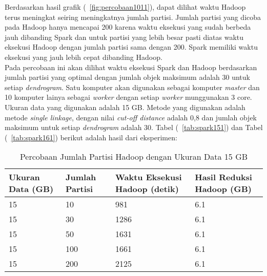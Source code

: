 Berdasarkan hasil grafik (~\ref{fig:percobaan1011}), dapat dilihat waktu Hadoop terus meningkat seiring meningkatnya jumlah partisi. Jumlah partisi yang dicoba pada Hadoop hanya mencapai 200 karena waktu eksekusi yang sudah berbeda jauh dibanding Spark dan untuk partisi yang lebih besar pasti diatas waktu eksekusi Hadoop dengan jumlah partisi sama dengan 200. Spark memiliki waktu eksekusi yang jauh lebih cepat dibanding Hadoop.  \\





Pada percobaan ini akan dilihat waktu eksekusi Spark dan Hadoop berdasarkan jumlah partisi yang optimal dengan jumlah objek maksimum adalah 30 untuk setiap \textit{dendrogram}. Satu komputer akan digunakan sebagai komputer \textit{master} dan 10 komputer lainya sebagai \textit{worker} dengan setiap \textit{worker} munggunakan 3 core. Ukuran data yang digunakan adalah 15 GB. Metode yang digunakan adalah metode \textit{single linkage}, dengan nilai \textit{cut-off distance} adalah 0,8 dan jumlah objek maksimum untuk setiap \textit{dendrogram} adalah 30. Tabel (~\ref{tab:spark151}) dan Tabel (~\ref{tab:spark161}) berikut adalah hasil dari eksperimen:





\begin{table}[H] 
	\centering 
	\caption{Percobaan Jumlah Partisi Hadoop dengan Ukuran Data 15 GB}
	\label{tab:spark1511}
	\begin{tabular}{|p{3cm}|p{3cm}|p{4cm}|p{4cm}|}
\hline
Ukuran Data (GB) & Jumlah Partisi &  Waktu Eksekusi Hadoop (detik) & Hasil Reduksi Hadoop (GB)\\
\hline
15 & 10 & 981  & 6.1  \\
\hline
15 & 30 & 1286  & 6.1  \\
\hline
15 & 50 & 1631  & 6.1  \\
\hline
15 & 100 & 1661 & 6.1  \\
\hline
15 & 200 & 2125 & 6.1  \\
\hline


\hline

	\end{tabular} 
\end{table}




